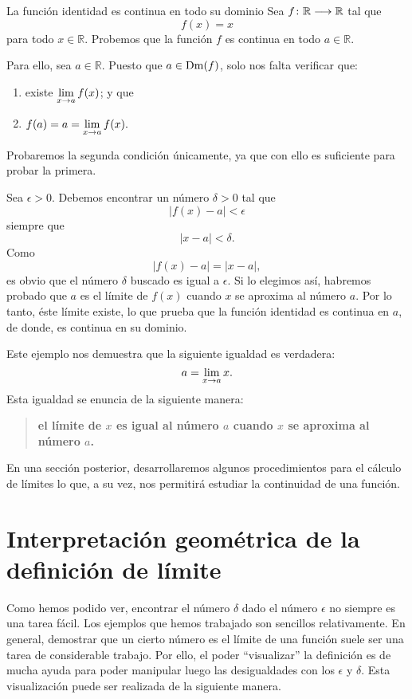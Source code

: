 \begin{exemplo}[Solución]{\label{ex:lim003}%
La función identidad es continua en todo su dominio}%
Sea $\funcjc{f}{\mathbb{R}}{\mathbb{R}}$ tal que
\[
f(x) = x
\]
para todo $x\in \mathbb{R}$. Probemos que la función $f$ es continua en todo $a\in\mathbb{R}$.

Para ello, sea $a\in\mathbb{R}$. Puesto que $a\in\Dm(f)$, solo nos falta verificar que:
\begin{enumerate}
\item existe $\displaystyle\limjc{f(x)}{x}{a}$; y que
\item $\displaystyle f(a) = a = \limjc{f(x)}{x}{a}.$
\end{enumerate}
Probaremos la segunda condición únicamente, ya que con ello es suficiente para probar la primera.

Sea $\epsilon > 0$. Debemos encontrar un número $\delta > 0$ tal que
\begin{equation}
\label{eq:lim002}
|f(x) - a| < \epsilon
\end{equation}
siempre que
\[
|x - a| < \delta.
\]
Como
\[
|f(x) - a| = |x - a|,
\]
es obvio que el número $\delta$ buscado es igual a $\epsilon$. Si lo elegimos así, habremos probado
que $a$ es el límite de $f(x)$ cuando $x$ se aproxima al número $a$. Por lo tanto, éste límite
existe, lo que prueba que la función identidad es continua en $a$, de donde, es continua en su
dominio.
\end{exemplo}

Este ejemplo nos demuestra que la siguiente igualdad es verdadera:
\begin{equation}
\label{eq:LimIdentidad}
a = \limjc{x}{x}{a}.
\end{equation}
Esta igualdad se enuncia de la siguiente manera:
\begin{quote}
\textbf{el límite de $x$ es igual al número $a$ cuando $x$ se aproxima al número $a$.}
\end{quote}

En una sección posterior, desarrollaremos algunos procedimientos para el cálculo de límites lo que,
a su vez, nos permitirá estudiar la continuidad de una función.

\section{Interpretación geométrica de la definición de límite}
Como hemos podido ver, encontrar el número $\delta$ dado el número $\epsilon$ no siempre es una
tarea fácil. Los ejemplos que hemos trabajado son sencillos relativamente. En general, demostrar
que un cierto número es el límite de una función suele ser una tarea de considerable trabajo. Por
ello, el poder ``visualizar'' la definición es de mucha ayuda para poder manipular luego las
desigualdades con los $\epsilon$ y $\delta$. Esta visualización puede ser realizada de la siguiente
manera.

